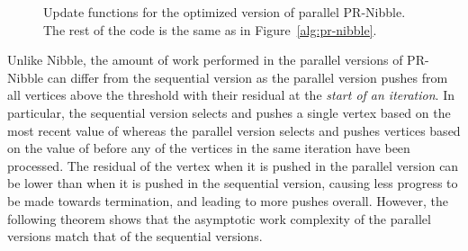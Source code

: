 \begin{figure}[!t]
\scriptsize
\begin{algorithmic}[1] 
 
\State 
\EndProcedure
\smallskip
{} 
\State 
\State 
\EndProcedure
\end{algorithmic}
\caption{Update functions for the optimized version of parallel PR-Nibble. The rest of the code is the same as in Figure~\ref{alg:pr-nibble}.} \label{alg:pr-nibble2}
\vspace{-4pt}
\end{figure}

Unlike Nibble, the amount of work performed in the parallel versions
of PR-Nibble can differ from the sequential version as
the parallel version pushes from all vertices above the threshold with
their residual at the \emph{start of an iteration}.  In particular,
the sequential version selects and pushes a single vertex based
on the most recent value of  whereas the parallel version selects
and pushes vertices based on the value of  before any of the
vertices in the same iteration have been processed.  The residual of
the vertex when it is pushed in the parallel version can be lower than
when it is pushed in the sequential version, causing less
progress to be made towards termination, and leading to more pushes
overall. However, the following theorem shows that the asymptotic work
complexity of the parallel versions match that of the sequential
versions.


